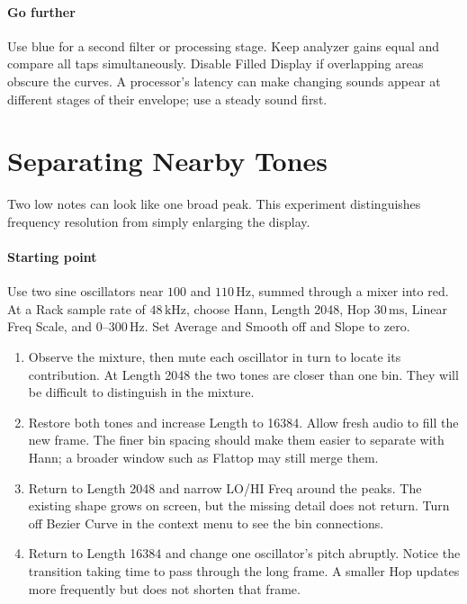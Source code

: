 \paragraph{Go further}
Use blue for a second filter or processing stage. Keep analyzer gains equal
and compare all taps simultaneously. Disable Filled Display if overlapping
areas obscure the curves. A processor's latency can make changing sounds
appear at different stages of their envelope; use a steady sound first.

\clearpage
\section{Separating Nearby Tones}\label{sec:resolution}

Two low notes can look like one broad peak. This experiment distinguishes
frequency resolution from simply enlarging the display.

\paragraph{Starting point}
Use two sine oscillators near $100$ and $110\,\mathrm{Hz}$, summed through
a mixer into red. At a Rack sample rate of $48\,\mathrm{kHz}$, choose Hann,
Length 2048, Hop $30\,\mathrm{ms}$, Linear Freq Scale, and
$0$--$300\,\mathrm{Hz}$. Set Average and Smooth off and Slope to zero.

\begin{enumerate}
  \item Observe the mixture, then mute each oscillator in turn to locate
  its contribution. At Length 2048 the two tones are closer than one bin.
  They will be difficult to distinguish in the mixture.
  \item Restore both tones and increase Length to 16384. Allow fresh audio
  to fill the new frame. The finer bin spacing should make them easier to
  separate with Hann; a broader window such as Flattop may still merge them.
  \item Return to Length 2048 and narrow LO/HI Freq around the peaks.
  The existing shape grows on screen, but the missing detail does not return.
  Turn off Bezier Curve in the context menu to see the bin connections.
  \item Return to Length 16384 and change one oscillator's pitch abruptly.
  Notice the transition taking time to pass through the long frame. A smaller
  Hop updates more frequently but does not shorten that frame.
\end{enumerate}

